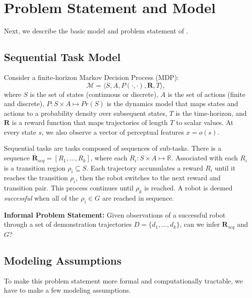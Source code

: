 \section{Problem Statement and Model}
Next, we describe the basic model and problem statement of \hirl.

\subsection{Sequential Task Model}
Consider a finite-horizon Markov Decision Process (MDP): \[\mathcal{M} = \langle S,A,P(\cdot,\cdot),\mathbf{R},T \rangle,\] where $S$ is the set of states (continuous or discrete), $A$ is the set of actions (finite and discrete), $P: S \times A \mapsto Pr(S)$ is the dynamics model that maps states and actions to a probability density over subsequent states, $T$ is the time-horizon, and $\mathbf{R}$ is a reward function that maps trajectories of length $T$ to scalar values. At every state $s$, we also observe a vector of perceptual features $x = o(s)$. 

Sequential tasks are tasks composed of sequences of sub-tasks. There is a sequence $\mathbf{R}_{seq}=[R_1,...,R_k]$, where each $R_i: S \times A \mapsto \mathbb{R}$. Associated with each $R_i$ is a transition region $\rho_i \subseteq S$. 
Each trajectory accumulates a reward $R_i$ until it reaches the transition $\rho_i$, then the robot switches to the next reward and transition pair.
This process continues until $\rho_k$ is reached.
A robot is deemed \emph{successful} when all of the $\rho_i \in G$ are reached in sequence.

\vspace{0.25em} \noindent \textbf{Informal Problem Statement: } Given observations of a successful robot through a set of demonstration trajectories $D = \{d_1,...,d_k\}$, can we infer $\mathbf{R}_{seq}$ and $G$?

\subsection{Modeling Assumptions}
To make this problem statement more formal and computationally tractable, we have to make a few modeling assumptions.

